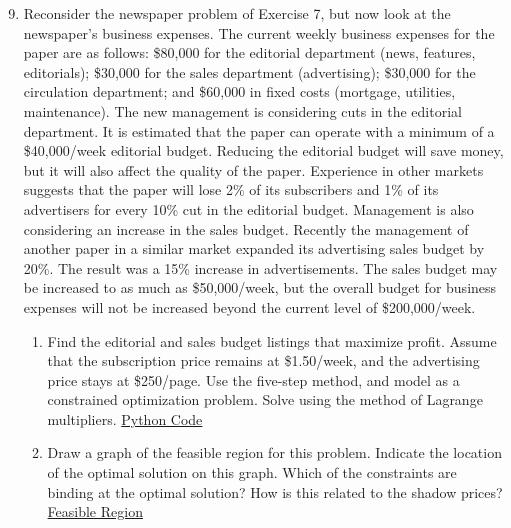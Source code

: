 \documentclass[12pt, oneside]{book}
\newenvironment{solution}{\textit{Solution.}}
\newcommand{\sol}[1]{
    \begin{customframedproof}[linecolor=orangehdx!75,]
        \begin{solution}
        #1
        \end{solution}
    \end{customframedproof}
}
\begin{document}
\begin{enumerate}
    \setcounter{enumi}{8}
    \item Reconsider the newspaper problem of Exercise 7, but now look at the newspaper’s business expenses. The current weekly business expenses for the paper are as follows: \$80,000 for the editorial department (news, features, editorials); \$30,000 for the sales department (advertising); \$30,000 for the circulation department; and \$60,000 in fixed costs (mortgage, utilities, maintenance). The new management is considering cuts in the editorial department. It is estimated that the paper can operate with a minimum of a \$40,000/week editorial budget. Reducing the editorial budget will save money, but it will also affect the quality of the paper. Experience in other markets suggests that the paper will lose 2\% of its subscribers and 1\% of its advertisers for every 10\% cut in the editorial budget. Management is also considering an increase in the sales budget. Recently the management of another paper in a similar market expanded its advertising sales budget by 20\%. The result was a 15\% increase in advertisements. The sales budget may be increased to as much as \$50,000/week, but the overall budget for business expenses will not be increased beyond the current level of \$200,000/week.
    \begin{enumerate}
        \item Find the editorial and sales budget listings that maximize profit. Assume that the subscription price remains at \$1.50/week, and the advertising price stays at \$250/page. Use the five-step method, and model as a constrained optimization problem. Solve using the method of Lagrange multipliers. \hyperref[ex:1]{Python Code}
        \setcounter{enumii}{2}
        \item Draw a graph of the feasible region for this problem. Indicate the location of the optimal solution on this graph. Which of the constraints are binding at the optimal solution? How is this related to the shadow prices? \hyperref[fig:1]{Feasible Region}

\end{enumerate}
\end{enumerate}
\end{document}
